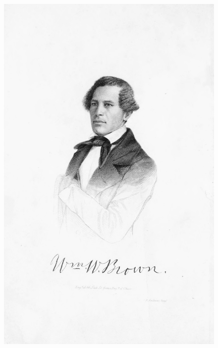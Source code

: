 \begin{absolutelynopagebreak}
\begin{vplace}
\begin{figure}[H]
\begin{adjustwidth}{-1.8cm}{}
  \vspace*{-2.6cm}
  \includegraphics[width=133mm]{./imgs/front1.jpg}  
\end{adjustwidth}
  \caption{}
\end{figure}
\end{vplace}

\thispagestyle{empty}
\end{absolutelynopagebreak}


